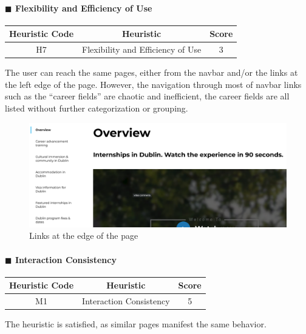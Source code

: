 \documentclass[11pt]{article} %
\begin{document}
\paragraph{$\blacksquare$ Flexibility and Efficiency of Use}
\begin{center}
    \begin{tabular}{|c|c|c|} 
    \hline
    \textbf{Heuristic Code} & \textbf{Heuristic} & \textbf{Score}\\ 
    \hline
    H7 & Flexibility and Efficiency of Use & 3 \\
    \hline
    \end{tabular}
\end{center}
The user can reach the same pages, either from the navbar and/or the links at the left edge of the page. However, the navigation through most of navbar links such as the “career fields” are chaotic and inefficient, the career fields are all listed without further categorization or grouping.

\begin{figure}[H]
  \centering
  \includegraphics[width=\textwidth]{Images/Screenshots/Left Links.png}
  \caption{Links at the edge of the page}
\end{figure}

\paragraph{$\blacksquare$ Interaction Consistency}
\begin{center}
    \begin{tabular}{|c|c|c|} 
    \hline
    \textbf{Heuristic Code} & \textbf{Heuristic} & \textbf{Score}\\ 
    \hline
    M1 & Interaction Consistency & 5 \\
    \hline
    \end{tabular}
\end{center}
The heuristic is satisfied, as similar pages manifest the same behavior.
\end{document}
